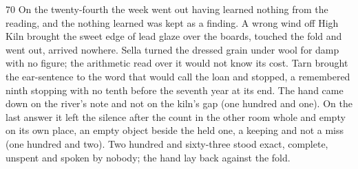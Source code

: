 \begin{CRchronicle}{70}
On the twenty-fourth the week went out having learned nothing from the reading, and the nothing learned was kept as a finding. A wrong wind off High Kiln brought the sweet edge of lead glaze over the boards, touched the fold and went out, arrived nowhere. Sella turned the dressed grain under wool for damp with no figure; the arithmetic read over it would not know its cost. Tarn brought the ear-sentence to the word that would call the loan and stopped, a remembered ninth stopping with no tenth before the seventh year at its end. The hand came down on the river’s note and not on the kiln’s gap (one hundred and one). On the last answer it left the silence after the count in the other room whole and empty on its own place, an empty object beside the held one, a keeping and not a miss (one hundred and two). Two hundred and sixty-three stood exact, complete, unspent and spoken by nobody; the hand lay back against the fold.
\end{CRchronicle}
